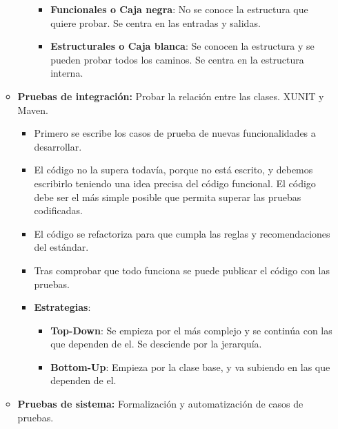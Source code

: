 \documentclass[12pt, twoside, openright]{report} %
\begin{document}
\begin{itemize}
\begin{itemize}
\begin{itemize}
      \begin{itemize}
      \item \textbf{Funcionales o Caja negra}: No se conoce la estructura
        que quiere probar. Se centra en las entradas y salidas.
        
      \item \textbf{Estructurales o Caja blanca}: Se conocen la estructura y
        se pueden probar todos los caminos. Se centra en la estructura
        interna.
        
      \end{itemize}
    \end{itemize}
  \item \textbf{Pruebas de integración:} Probar la relación entre las
    clases. XUNIT y Maven.
    

    \begin{itemize}
    \item Primero se escribe los casos de prueba de nuevas funcionalidades a
      desarrollar.
      
    \item El código no la supera todavía, porque no está escrito, y debemos
      escribirlo teniendo una idea precisa del código funcional. El
      código debe ser el más simple posible que permita superar las
      pruebas codificadas.
      
    \item El código se refactoriza para que cumpla las reglas y
      recomendaciones del estándar.
      
    \item Tras comprobar que todo funciona se puede publicar el código con
      las pruebas.
      
    \item \textbf{Estrategias}:
      

      \begin{itemize}
      \item \textbf{Top-Down}: Se empieza por el más complejo y se continúa
        con las que dependen de el. Se desciende por la jerarquía.
        
      \item \textbf{Bottom-Up}: Empieza por la clase base, y va subiendo en
        las que dependen de el.
        
      \end{itemize}
    \end{itemize}
  \item \textbf{Pruebas de sistema:} Formalización y automatización de casos
    de pruebas.
    

\end{itemize}
\end{itemize}
\end{document}
